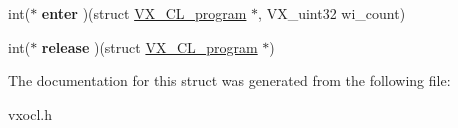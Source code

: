\begin{DoxyCompactItemize}
\item 
\hypertarget{structVX__CL__program_a0835c59d5e97b3b193aa11e4f0970141}{int($\ast$ {\bfseries enter} )(struct \hyperlink{structVX__CL__program}{V\-X\-\_\-\-C\-L\-\_\-program} $\ast$, V\-X\-\_\-uint32 wi\-\_\-count)}\label{structVX__CL__program_a0835c59d5e97b3b193aa11e4f0970141}

\item 
\hypertarget{structVX__CL__program_a1064a2475145f0ad20335cdde964ded7}{int($\ast$ {\bfseries release} )(struct \hyperlink{structVX__CL__program}{V\-X\-\_\-\-C\-L\-\_\-program} $\ast$)}\label{structVX__CL__program_a1064a2475145f0ad20335cdde964ded7}

\end{DoxyCompactItemize}


The documentation for this struct was generated from the following file\-:\begin{DoxyCompactItemize}
\item 
vxocl.\-h\end{DoxyCompactItemize}
